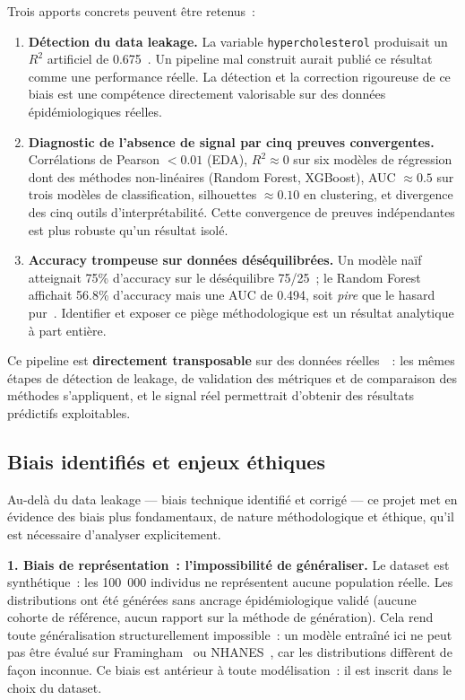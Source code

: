 Trois apports concrets peuvent être retenus~:

\begin{enumerate}
  \item \textbf{Détection du data leakage.} La variable \texttt{hypercholesterol} produisait un $R^2$ artificiel de 0.675~\cite{kaufman2012}. Un pipeline mal construit aurait publié ce résultat comme une performance réelle. La détection et la correction rigoureuse de ce biais est une compétence directement valorisable sur des données épidémiologiques réelles.

  \item \textbf{Diagnostic de l'absence de signal par cinq preuves convergentes.} Corrélations de Pearson $< 0.01$ (EDA), $R^2 \approx 0$ sur six modèles de régression dont des méthodes non-linéaires (Random Forest, XGBoost), AUC $\approx 0.5$ sur trois modèles de classification, silhouettes $\approx 0.10$ en clustering, et divergence des cinq outils d'interprétabilité. Cette convergence de preuves indépendantes est plus robuste qu'un résultat isolé.

  \item \textbf{Accuracy trompeuse sur données déséquilibrées.} Un modèle naïf atteignait 75\% d'accuracy sur le déséquilibre 75/25~; le Random Forest affichait 56.8\% d'accuracy mais une AUC de 0.494, soit \textit{pire} que le hasard pur~\cite{sokolova2009}. Identifier et exposer ce piège méthodologique est un résultat analytique à part entière.
\end{enumerate}

Ce pipeline est \textbf{directement transposable} sur des données réelles~\cite{dawber1951, nhanes}~: les mêmes étapes de détection de leakage, de validation des métriques et de comparaison des méthodes s'appliquent, et le signal réel permettrait d'obtenir des résultats prédictifs exploitables.

\subsection{Biais identifiés et enjeux éthiques}

Au-delà du data leakage --- biais technique identifié et corrigé --- ce projet met en évidence des biais plus fondamentaux, de nature méthodologique et éthique, qu'il est nécessaire d'analyser explicitement.

\textbf{1. Biais de représentation~: l'impossibilité de généraliser.} Le dataset est synthétique~: les 100~000 individus ne représentent aucune population réelle. Les distributions ont été générées sans ancrage épidémiologique validé (aucune cohorte de référence, aucun rapport sur la méthode de génération). Cela rend toute généralisation structurellement impossible~: un modèle entraîné ici ne peut pas être évalué sur Framingham~\cite{dawber1951} ou NHANES~\cite{nhanes}, car les distributions diffèrent de façon inconnue. Ce biais est antérieur à toute modélisation~: il est inscrit dans le choix du dataset.

